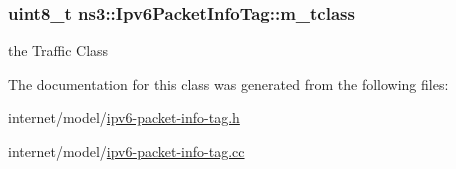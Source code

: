 \subsubsection[{\texorpdfstring{m\+\_\+tclass}{m_tclass}}]{\setlength{\rightskip}{0pt plus 5cm}uint8\+\_\+t ns3\+::\+Ipv6\+Packet\+Info\+Tag\+::m\+\_\+tclass\hspace{0.3cm}{\ttfamily [private]}}\hypertarget{classns3_1_1Ipv6PacketInfoTag_a8bf3e03ce9e5c570df4a0f916caca9b9}{}\label{classns3_1_1Ipv6PacketInfoTag_a8bf3e03ce9e5c570df4a0f916caca9b9}


the Traffic Class 



The documentation for this class was generated from the following files\+:\begin{DoxyCompactItemize}
\item 
internet/model/\hyperlink{ipv6-packet-info-tag_8h}{ipv6-\/packet-\/info-\/tag.\+h}\item 
internet/model/\hyperlink{ipv6-packet-info-tag_8cc}{ipv6-\/packet-\/info-\/tag.\+cc}\end{DoxyCompactItemize}
